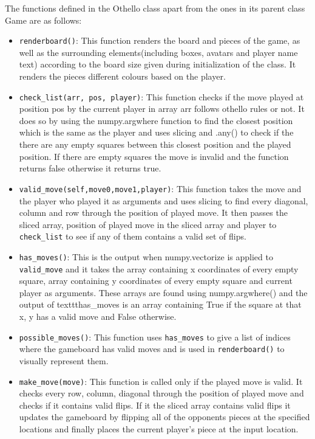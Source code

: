 \documentclass[12pt, letter]{article}
\begin{document}
The functions defined in the Othello class apart from the ones in its parent class Game are as follows:
\begin{itemize}
    \item \texttt{renderboard()}: This function renders the board and pieces of the game, as well as the surrounding elements(including boxes, avatars and player name text) according to the board size given during initialization of the class. It renders the pieces different colours based on the player.
    \item \texttt{check\_list(arr, pos, player)}: This function checks if the move played at position pos by the current player in array arr follows othello rules or not. It does so by using the numpy.argwhere function to find the closest position which is the same as the player and uses slicing and .any() to check if the there are any empty squares between this closest position and the played position. If there are empty squares the move is invalid and the function returns false otherwise it returns true.
    \item \texttt{valid\_move(self,move0,move1,player)}: This function takes the move and the player who played it as arguments and uses slicing to find every diagonal, column and row through the position of played move. It then passes the sliced array, position of played move in the sliced array and player to \texttt{check\_list} to see if any of them contains a valid set of flips.
    \item \texttt{has\_moves()}: This is the output when numpy.vectorize is applied to \texttt{valid\_move} and it takes the array containing x coordinates of every empty square, array containing y coordinates of every empty square and current player as arguments. These arrays are found using numpy.argwhere() and the output of texttt{has\_moves} is an array containing True if the square at that x, y has a valid move and False otherwise.
    \item \texttt{possible\_moves()}: This function uses \texttt{has\_moves} to give a list of indices where the gameboard has valid moves and is used in \texttt{renderboard()} to visually represent them.
    \item \texttt{make\_move(move)}: This function is called only if the played move is valid. It checks every row, column, diagonal through the position of played move and checks if it contains valid flips. If it the sliced array contains valid flips it updates the gameboard by flipping all of the opponents pieces at the specified locations and finally places the current player's piece at the input location.

\end{itemize}
\end{document}
